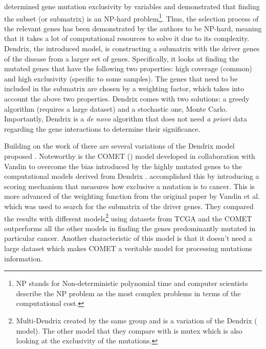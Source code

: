 \citet{Vandin2012-cf} determined gene mutation exclusivity by variables and demonstrated that finding the subset (or submatrix) is an NP-hard problem\footnote{ NP stands for Non-deterministic polynomial time and computer scientists describe the NP problem as the most complex problems in terms of the computational cost.}. Thus, the selection process of the relevant genes has been demonstrated by the authors to be NP-hard, meaning that it takes a lot of computational resources to solve it due to its complexity. Dendrix, the introduced model, is constructing a submatrix with the driver genes of the disease from a larger set of genes. Specifically, it looks at finding the mutated genes that have the following two properties: high coverage (common) and high exclusivity (specific to some samples). The genes that need to be included in the submatrix are chosen by a weighting factor, which takes into account the above two properties. Dendrix comes with two solutions: a greedy algorithm (requires a large dataset) and a stochastic one, Monte Carlo. Importantly, Dendrix is a \textit{de novo} algorithm that does not need \textit{a priori} data regarding the gene interactions to determine their significance.

Building on the work of \citet{Vandin2012-cf} there are several variations of the Dendrix model proposed \cite{Leiserson2013-da,Szczurek2014-dh,Leiserson2015-yk}. Noteworthy is the COMET (\citet{Leiserson2015-yk}) model developed in collaboration with Vandin to overcome the bias introduced by the highly mutated genes to the computational models derived from Dendrix \cite{Vandin2012-ns}. \citet{Leiserson2015-yk} accomplished this by introducing a scoring mechanism that measures how exclusive a mutation is to cancer. This is more advanced of the weighting function from the original paper by Vandin et al. which was used to search for the submatrix of the driver genes. They compared the results with different models\footnote{Multi-Dendrix\cite{Leiserson2013-da} created by the same group and is a variation of the Dendrix (\citet{Vandin2012-cf} model). The other model that they compare with is mutex\cite{Babur2015-qk} which is also looking at the exclusivity of the mutations.} using datasets from TCGA and the COMET outperforms all the other models\cite{Leiserson2013-da,Szczurek2014-dh} in finding the genes predominantly mutated in particular cancer. Another characteristic of this model is that it doesn’t need a large dataset which makes COMET a veritable model for processing mutations information.

